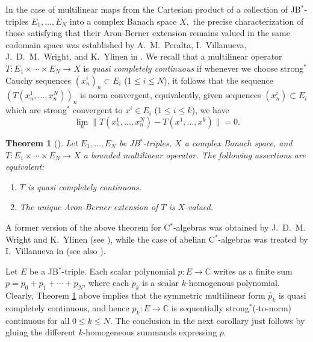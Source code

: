 \documentclass[10pt]{amsart}
\newtheorem{theorem}{Theorem}[section]
\begin{document}
	In the case of multilinear maps from the Cartesian product of a collection of JB$^*$-triples $E_1, \ldots, E_N$ into a complex Banach space $X,$ the precise characterization of those satisfying that their Aron-Berner extension remains valued in the same codomain space was established by A.~M.~Peralta, I.~Villanueva, J.~D.~M.~Wright, and K.~Ylinen in \cite{PeViWriYl2010multi}. We recall that a multilinear operator $T\colon E_1\times \cdots \times E_N\longrightarrow X$ is \emph{quasi completely continuous} if whenever we choose strong$^*$ Cauchy sequences $(x_n^i)_n\subset E_i$ ($1\leq i \leq N$), it follows that the sequence $(T(x_n^1,\ldots, x_n^N))_n$ is norm convergent, equivalently, given sequences $(x^i_n)\subset E_i$
	which are strong$^*$ convergent to $x^i\in E_i$ ($1\leq i \leq k$), we have
	\begin{equation*}
		\lim_n \|T(x^1_n,\ldots, x^N_n)-T(x^1,\ldots,x^k)\|=0.
	\end{equation*}
	
	\begin{theorem}[\textrm{\cite[Theorem 3.9]{PeViWriYl2010multi}}]\label{t characterization PVWY multi} Let $E_1,\ldots,E_N$ be JB$^*$-triples, $X$ a complex Banach space, and $T \colon E_1\times	\cdots \times E_N \longrightarrow X$ a bounded multilinear operator. The following assertions are equivalent:
		\begin{enumerate}[$(1)$]
			\item $T$ is quasi completely continuous.
			\item The unique Aron-Berner extension of $T$ is $X$-valued.
		\end{enumerate}
	\end{theorem}
	
	A former version of the above theorem for C$^*$-algebras was obtained by J.~D.~M. Wright and K.~Ylinen (see \cite[Corollary 3.6]{WriYli}), while the case of abelian C$^*$-algebras was treated by I.~Villanueva in \cite{Vi} (see also \cite[Corollary 3.7]{WriYli}).
	
	
	Let $E$ be a JB$^*$-triple. Each scalar polynomial $p\colon E\longrightarrow \mathbb{C}$ writes as a finite sum $p = p_0+p_1+\cdots +p_N$, where each $p_k$ is a scalar $k$-homogenous polynomial. Clearly, Theorem \ref{t characterization PVWY multi} above implies that the symmetric multilinear form $\widehat{p}_k$ is quasi completely continuous, and hence $p_k\colon E\longrightarrow \mathbb{C}$ is sequentially strong$^*$(-to-norm) continuous for all $0\leq k\leq N$. The conclusion in the next corollary just follows by gluing the different $k$-homogeneous summands expressing $p$.
	
\end{document}
